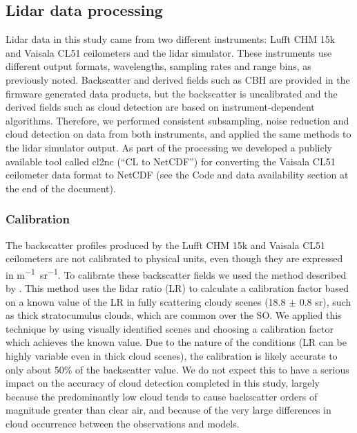 \subsection{Lidar data processing}
\label{sec:lidar-data-processing}

Lidar data in this study came from two different instruments: Lufft CHM 15k and
Vaisala CL51 ceilometers and the lidar simulator. These instruments use
different output formats, wavelengths, sampling rates and range bins, as
previously noted. Backscatter and derived fields such as CBH are provided in the
firmware generated data products, but the backscatter is uncalibrated and the
derived fields such as cloud detection are based on instrument-dependent
algorithms. Therefore, we performed consistent subsampling, noise reduction and
cloud detection on data from both instruments, and applied the same methods to
the lidar simulator output. As part of the processing we developed a publicly
available tool called cl2nc (``CL to NetCDF'') for converting the Vaisala CL51
ceilometer data format to NetCDF (see the Code and data availability section at
the end of the document).

\subsubsection{Calibration}
\label{sec:calibration}

The backscatter profiles produced by the Lufft CHM 15k and Vaisala CL51
ceilometers are not calibrated to physical units, even though they are expressed
in \unit{m^{-1} sr^{-1}}. To calibrate these backscatter fields we used the
method described by \cite{oconnor2004}. This method uses the lidar ratio (LR) to
calculate a calibration factor based on a known value of the LR in fully
scattering cloudy scenes (18.8 $\pm$ 0.8 \unit{sr}), such as thick stratocumulus
clouds, which are common over the SO. We applied this technique by using
visually identified scenes and choosing a calibration factor which achieves the
known value. Due to the nature of the conditions (LR can be highly variable even
in thick cloud scenes), the calibration is likely accurate to only about 50\% of
the backscatter value. We do not expect this to have a serious impact on the
accuracy of cloud detection completed in this study, largely because the
predominantly low cloud tends to cause backscatter orders of magnitude greater
than clear air, and because of the very large differences in cloud occurrence
between the observations and models.


